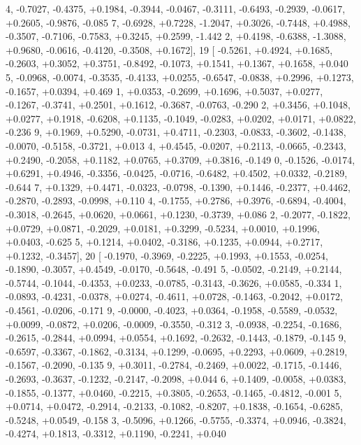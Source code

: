 \begin{DoxyCode}
      4, -0.7027, -0.4375, +0.1984, -0.3944, -0.0467, -0.3111, -0.6493, -0.2939, -0.0617, +0.2605, -0.9876, -0.085
      7, -0.6928, +0.7228, -1.2047, +0.3026, -0.7448, +0.4988, -0.3507, -0.7106, -0.7583, +0.3245, +0.2599, -1.442
      2, +0.4198, -0.6388, -1.3088, +0.9680, -0.0616, -0.4120, -0.3508, +0.1672],
19 [ -0.5261, +0.4924, +0.1685, -0.2603, +0.3052, +0.3751, -0.8492, -0.1073, +0.1541, +0.1367, +0.1658, +0.040
      5, -0.0968, -0.0074, -0.3535, -0.4133, +0.0255, -0.6547, -0.0838, +0.2996, +0.1273, -0.1657, +0.0394, +0.469
      1, +0.0353, -0.2699, +0.1696, +0.5037, +0.0277, -0.1267, -0.3741, +0.2501, +0.1612, -0.3687, -0.0763, -0.290
      2, +0.3456, +0.1048, +0.0277, +0.1918, -0.6208, +0.1135, -0.1049, -0.0283, +0.0202, +0.0171, +0.0822, -0.236
      9, +0.1969, +0.5290, -0.0731, +0.4711, -0.2303, -0.0833, -0.3602, -0.1438, -0.0070, -0.5158, -0.3721, +0.013
      4, +0.4545, -0.0207, +0.2113, -0.0665, -0.2343, +0.2490, -0.2058, +0.1182, +0.0765, +0.3709, +0.3816, -0.149
      0, -0.1526, -0.0174, +0.6291, +0.4946, -0.3356, -0.0425, -0.0716, -0.6482, +0.4502, +0.0332, -0.2189, -0.644
      7, +0.1329, +0.4471, -0.0323, -0.0798, -0.1390, +0.1446, -0.2377, +0.4462, -0.2870, -0.2893, -0.0998, +0.110
      4, -0.1755, +0.2786, +0.3976, -0.6894, -0.4004, -0.3018, -0.2645, +0.0620, +0.0661, +0.1230, -0.3739, +0.086
      2, -0.2077, -0.1822, +0.0729, +0.0871, -0.2029, +0.0181, +0.3299, -0.5234, +0.0010, +0.1996, +0.0403, -0.625
      5, +0.1214, +0.0402, -0.3186, +0.1235, +0.0944, +0.2717, +0.1232, -0.3457],
20 [ -0.1970, -0.3969, -0.2225, +0.1993, +0.1553, -0.0254, -0.1890, -0.3057, +0.4549, -0.0170, -0.5648, -0.491
      5, -0.0502, -0.2149, +0.2144, -0.5744, -0.1044, -0.4353, +0.0233, -0.0785, -0.3143, -0.3626, +0.0585, -0.334
      1, -0.0893, -0.4231, -0.0378, +0.0274, -0.4611, +0.0728, -0.1463, -0.2042, +0.0172, -0.4561, -0.0206, -0.171
      9, -0.0000, -0.4023, +0.0364, -0.1958, -0.5589, -0.0532, +0.0099, -0.0872, +0.0206, -0.0009, -0.3550, -0.312
      3, -0.0938, -0.2254, -0.1686, -0.2615, -0.2844, +0.0994, +0.0554, +0.1692, -0.2632, -0.1443, -0.1879, -0.145
      9, -0.6597, -0.3367, -0.1862, -0.3134, +0.1299, -0.0695, +0.2293, +0.0609, +0.2819, -0.1567, -0.2090, -0.135
      9, +0.3011, -0.2784, -0.2469, +0.0022, -0.1715, -0.1446, -0.2693, -0.3637, -0.1232, -0.2147, -0.2098, +0.044
      6, +0.1409, -0.0058, +0.0383, -0.1855, -0.1377, +0.0460, -0.2215, +0.3805, -0.2653, -0.1465, -0.4812, -0.001
      5, +0.0714, +0.0472, -0.2914, -0.2133, -0.1082, -0.8207, +0.1838, -0.1654, -0.6285, -0.5248, +0.0549, -0.158
      3, -0.5096, +0.1266, -0.5755, -0.3374, +0.0946, -0.3824, -0.4274, +0.1813, -0.3312, +0.1190, -0.2241, +0.040

\end{DoxyCode}

